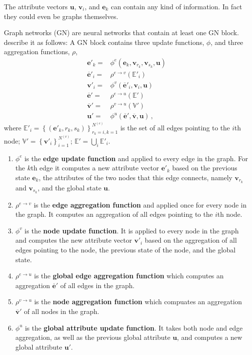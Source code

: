 The attribute vectors $\bm{u}$, $\bm{v}_i$, and $\bm{e}_k$ can contain any kind of information. In fact they could even be graphs themselves.

Graph networks (GN) are neural networks that contain at least one GN block. \cite{deepmind:graphnets} describe it as follows: A GN block contains three update functions, $\phi$, and three aggregation functions, $\rho$,
\begin{align}
    \bm{e}'_k=&\phi^e\left(\bm{e}_k,\bm{v}_{r_k},\bm{v}_{s_k},\bm{u}\right)\\
    \bm{\overline{e}}'_i=&\rho^{e\rightarrow v}\left(\mathbb{E}'_i\right)\\
    \bm{v}'_i=&\phi^v\left(\bm{\overline{e}}'_i,\bm{v}_i,\bm{u}\right)\\
    \bm{\overline{e}}'=&\rho^{e\rightarrow u}\left(\mathbb{E}'\right)\\
    \bm{\overline{v}}'=&\rho^{v\rightarrow u}\left(\mathbb{V}'\right)\\
    \bm{u}'=&\phi^u\left(\bm{\overline{e}}',\bm{\overline{v}},\bm{u}\right)\,,
\end{align}
where $\mathbb{E}'_i=\left\{\left(\bm{e}'_k,r_k,s_k\right)\right\}_{r_k=i,k=1}^{N^{(e)}}$ is the set of all edges pointing to the $i$th node; $\mathbb{V}'=\left\{\bm{v}'_i\right\}_{i=1}^{N^{(v)}}$; $\mathbb{E}'=\bigcup_i\mathbb{E}'_i$.

\begin{enumerate}
    \item $\phi^e$ is the \textbf{edge update function} and applied to every edge in the graph. For the $k$th edge it computes a new attribute vector $\bm{e}'_k$ based on the previous state $\bm{e}_k$, the attributes of the two nodes that this edge connects, namely $\bm{v}_{r_k}$ and $\bm{v}_{s_k}$, and the global state $\bm{u}$.
    \item $\rho^{e\rightarrow v}$ is the \textbf{edge aggregation function} and applied once for every node in the graph. It computes an aggregation of all edges pointing to the $i$th node.
    \item $\phi^v$ is the \textbf{node update function}. It is applied to every node in the graph and computes the new attribute vector $\bm{v}'_i$ based on the aggregation of all edges pointing to the node, the previous state of the node, and the global state.
    \item $\rho^{e\rightarrow u}$ is the \textbf{global edge aggregation function} which computes an aggregation $\bm{\overline{e}}'$ of all edges in the graph.
    \item $\rho^{v\rightarrow u}$ is the \textbf{node aggregation function} which compuates an aggregation $\bm{\overline{v}}'$ of all nodes in the graph.
    \item $\phi^u$ is the \textbf{global attribute update function}. It takes both node and edge aggregation, as well as the previous global attribute $\bm{u}$, and computes a new global attribute $\bm{u}'$.
\end{enumerate}

